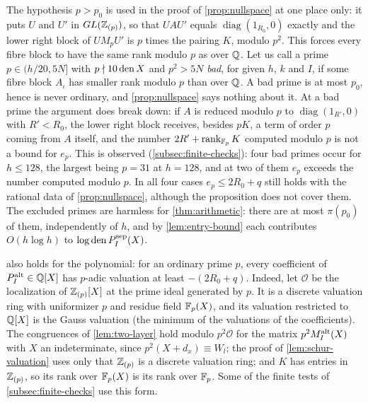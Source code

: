 \begin{remark}\label{rem:bad-primes}
The hypothesis $p>p_0$ is used in the proof of \cref{prop:nullspace} at one place only: it puts
$U$ and $U'$ in $GL(\mathbb{Z}_{(p)})$, so that $UAU'$ equals $\operatorname{diag}(1_{R_0},0)$ exactly and the
lower right block of $UM_pU'$ is $p$ times the pairing $K$, modulo $p^2$. This forces every fibre
block to have the same rank modulo $p$ as over $\mathbb{Q}$. Let us call a prime $p\in(h/20,5N]$ with
$p\nmid10\operatorname{den} X$ and $p^2>5N$ \emph{bad}, for given $h$, $k$ and $I$, if some fibre block
$A_\iota$ has smaller rank modulo $p$ than over $\mathbb{Q}$. A bad prime is at most $p_0$, hence is never
ordinary, and \cref{prop:nullspace} says nothing about it. At a bad prime the argument does break
down: if $A$ is reduced modulo $p$ to $\operatorname{diag}(1_{R'},0)$ with $R'<R_0$, the lower
right block receives, besides $pK$, a term of order $p$ coming from $A$ itself, and the number
$2R'+\operatorname{rank}_{\mathbb{F}_p}K$ computed modulo $p$ is not a bound for $e_p$. This is observed
(\cref{subsec:finite-checks}): four bad primes occur for $h\le128$, the largest being $p=31$ at
$h=128$, and at two of them $e_p$ exceeds the number computed modulo $p$. In all four cases
$e_p\le2R_0+q$ still holds with the rational data of \cref{prop:nullspace}, although the
proposition does not cover them. The excluded primes are harmless for \cref{thm:arithmetic}: there
are at most $\pi(p_0)$ of them, independently of $h$, and by \cref{lem:entry-bound} each contributes
$O(h\log h)$ to $\log\operatorname{den} P^{\mathrm{sep}}_I(X)$.
\end{remark}

\begin{remark}\label{rem:gauss}
 also holds for the polynomial: for an ordinary prime $p$, every coefficient
of $P^{\mathrm{alt}}_I\in\mathbb{Q}[X]$ has $p$-adic valuation at least $-(2R_0+q)$. Indeed, let $\mathcal O$ be
the localization of $\mathbb{Z}_{(p)}[X]$ at the prime ideal generated by $p$. It is a discrete valuation ring
with uniformizer $p$ and residue field $\mathbb{F}_p(X)$, and its valuation restricted to $\mathbb{Q}[X]$ is the
Gauss valuation (the minimum of the valuations of the coefficients). The congruences of
\cref{lem:two-layer} hold modulo $p^2\mathcal O$ for the matrix $p^2M^{\mathrm{alt}}_I(X)$ with $X$ an
indeterminate, since $p^2(X+d_x)\equiv W_l$; the proof of \cref{lem:schur-valuation} uses only that
$\mathbb{Z}_{(p)}$ is a discrete valuation ring; and $K$ has entries in $\mathbb{Z}_{(p)}$, so its rank over $\mathbb{F}_p(X)$ is its
rank over $\mathbb{F}_p$. Some of the finite tests of \cref{subsec:finite-checks} use this form.
\end{remark}

